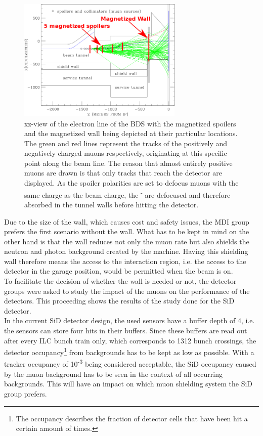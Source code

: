 \documentclass[12pt]{article}
\begin{document}
\begin{figure}
    \centering
    \includegraphics[width=0.7\textwidth]{figures/BDS_Tunnel_Spoilers+Wall.png}
    \caption[BDS tunnel with the spoiler and wall positions]{
    xz-view of the electron line of the BDS with the magnetized spoilers and the magnetized wall being depicted at their particular locations.
    The green and red lines represent the tracks of the positively and negatively charged muons respectively, originating at this specific point along the beam line.
    The reason that almost entirely positive muons are drawn is that only tracks that reach the detector are displayed.
    As the spoiler polarities are set to defocus muons with the same charge as the beam charge, the \textmu\textsuperscript{-} are defocused and therefore absorbed in the tunnel walls before hitting the detector.
    }
    \label{fig:Spoilers_Wall_Locations}
\end{figure}

Due to the size of the wall, which causes cost and safety issues, the MDI group prefers the first scenario without the wall.
What has to be kept in mind on the other hand is that the wall reduces not only the muon rate but also shields the neutron and photon background created by the machine.
Having this shielding wall therefore means the access to the interaction region, i.e. the access to the detector in the garage position, would be permitted when the beam is on.
\\
To facilitate the decision of whether the wall is needed or not, the detector groups were asked to study the impact of the muons on the performance of the detectors.
This proceeding shows the results of the study done for the SiD detector.\\
In the current SiD detector design, the used sensors have a buffer depth of 4, i.e. the sensors can store four hits in their buffers.
Since these buffers are read out after every ILC bunch train only, which corresponds to 1312 bunch crossings, the detector occupancy\footnote{The occupancy describes the fraction of detector cells that have been hit a certain amount of times.} from backgrounds has to be kept as low as possible.
With a tracker occupancy of 10\textsuperscript{-3} being considered acceptable, the SiD occupancy caused by the muon background has to be seen in the context of all occurring backgrounds.
This will have an impact on which muon shielding system the SiD group prefers.
\end{document}
